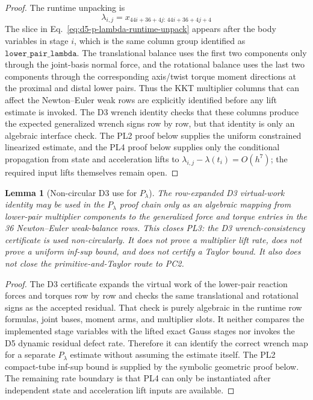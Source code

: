 \documentclass[preprint,12pt]{elsarticle}
\newtheorem{lemma}{Lemma}
\begin{document}
\begin{proof}
The runtime unpacking is
\begin{equation}
\label{eq:d5-p-lambda-runtime-unpack}
\lambda_{i,j}=x_{44i+36+4j:\,44i+36+4j+4}
\end{equation}
The slice in Eq.~\eqref{eq:d5-p-lambda-runtime-unpack} appears after the body variables in stage \(i\), which is the same column group
identified as \(\texttt{lower\_pair\_lambda}\).  The translational balance uses
the first two components only through the joint-basis normal force, and the
rotational balance uses the last two components through the corresponding
axis/twist torque moment directions at the proximal and distal lower pairs.
Thus the KKT multiplier columns that can affect the Newton--Euler weak rows
are explicitly identified before any lift estimate is invoked.  The D3
wrench identity checks that these columns produce the expected generalized
wrench signs row by row, but that identity is only an algebraic interface
check.  The PL2 proof below supplies the uniform constrained linearized
estimate, and the PL4 proof below supplies only the conditional propagation
from state and acceleration lifts to
\(\lambda_{i,j}-\lambda(t_i)=O(h^7)\); the required input lifts themselves
remain open.
\end{proof}

\begin{lemma}[Non-circular D3 use for \(P_{\lambda}\)]
\label{lem:d5-p-lambda-d3-noncircularity}
The row-expanded D3 virtual-work identity may be used in the
\(P_{\lambda}\) proof chain only as an algebraic mapping from lower-pair
multiplier components to the generalized force and torque entries in the 36
Newton--Euler weak-balance rows.  This closes PL3: the D3 wrench-consistency
certificate is used non-circularly.  It does not prove a multiplier lift rate, does
not prove a uniform inf-sup bound, and does not certify a Taylor bound. It
also does not close the primitive-and-Taylor route to PC2.
\end{lemma}

\begin{proof}
The D3 certificate expands the virtual work of the lower-pair reaction forces and
torques row by row and checks the same translational and rotational signs as
the accepted residual.  That check is purely algebraic in the runtime row
formulas, joint bases, moment arms, and multiplier slots.  It neither compares
the implemented stage variables with the lifted exact Gauss stages nor invokes
the D5 dynamic residual defect rate.  Therefore it can identify the correct
wrench map for a separate \(P_{\lambda}\) estimate without assuming the estimate
itself.  The PL2 compact-tube inf-sup bound is supplied by the symbolic
geometric proof below.  The remaining rate boundary is that PL4 can only be
instantiated after independent state and acceleration lift inputs are
available.
\end{proof}
\end{document}
